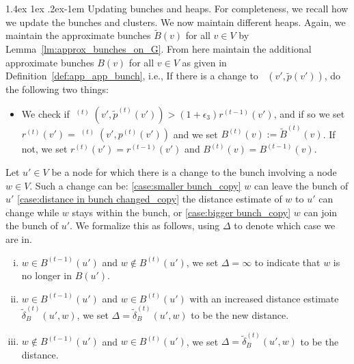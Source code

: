 \documentclass[11pt]{article}
\makeatletter
\theoremstyle{definition}
\theoremstyle{remark}
\DeclareMathOperator{\dLNbunch}{\delta_{\tilde{B}}}
\renewcommand{\paragraph}{%
  \@startsection{paragraph}{4}%
  {\z@}{1.4ex \@plus 1ex \@minus .2ex}{-1em}%
  {\normalfont\normalsize\bfseries}%
}
\makeatother
\begin{document}
\paragraph{Updating bunches and heaps.}
For completeness, we recall how we update the bunches and clusters. We now maintain different heaps. Again, we maintain the approximate bunches $\tilde B(v)$ for all $v\in V$ by Lemma~\ref{lm:approx_bunches_on_G}. From here maintain the additional approximate bunches $B(v)$ for all $v\in V$ as given in Definition~\ref{def:app_app_bunch}, i.e., 
If there is a change to $\dLNbunch(v',\tilde p(v'))$, do the following two things:
    \begin{itemize}
        \item We check if $\dLNbunch^{(t)}(v',\tilde p^{(t)}(v'))> (1+\epsilon_3)r^{(t-1)}(v')$, and if so we set $r^{(t)}(v')=\dLNbunch^{(t)}(v',p^{(t)}(v'))$ and we set $B^{(t)}(v):=\tilde B^{(t)}(v)$. If not, we set $r^{(t)}(v')=r^{(t-1)}(v')$ and $B^{(t)}(v)=B^{(t-1)}(v)$.
    \end{itemize}
 Let $u'\in V$ be a node for which there is a change to the bunch involving a node $w\in V$. Such a change can be: \ref{case:smaller bunch_copy} $w$ can leave the bunch of $u'$ \ref{case:distance in bunch changed_copy} the distance estimate of $w$ to $u'$ can change while $w$ stays within the bunch, or \ref{case:bigger bunch_copy} $w$ can join the bunch of $u'$. We formalize this as follows, using $\Delta$ to denote which case we are in.
    \begin{enumerate}[(i)]
        \item $w\in B^{(t-1)}(u')$ and $w\notin B^{(t)}(u')$, we set $\Delta=\infty$ to indicate that $w$ is no longer in $B(u')$. \label{case:smaller bunch_copy}
        \item $w\in B^{(t-1)}(u')$ and $w\in B^{(t)}(u')$ with an increased distance estimate $\tilde \delta_B^{(t)}(u',w)$, we set $\Delta=\tilde \delta_B^{(t)}(u',w)$ to be the new distance. \label{case:distance in bunch changed_copy}
        \item \label{case:bigger bunch_copy} $w\notin B^{(t-1)}(u')$ and $w\in B^{(t)}(u')$, we set $\Delta=\tilde \delta_B^{(t)}(u',w)$ to be the distance. 
    \end{enumerate}
        
    
    
\end{document}
